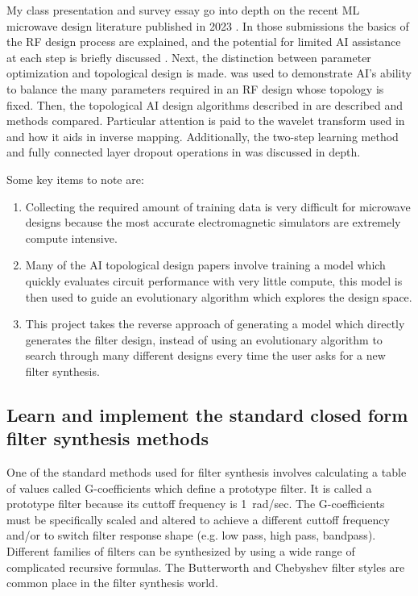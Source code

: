 \documentclass[10pt,conference]{IEEEtran}
\begin{document}
My class presentation and survey essay go into depth on the recent ML microwave design literature published in 2023 . In those submissions the basics of the RF design process are explained, and the potential for limited AI assistance at each step is briefly discussed \cite{lee2024icdesign}. Next, the distinction between parameter optimization and topological design is made. \cite{xue2023mmic} was used to demonstrate AI's ability to balance the many parameters required in an RF design whose topology is fixed. Then, the topological AI design algorithms described in \cite{xu2024microwave, karahan2024rfdesign, taskiran2024annsynthesis} are described and methods compared. Particular attention is paid to the wavelet transform used in \cite{xu2024microwave} and how it aids in inverse mapping. Additionally, the two-step learning method and fully connected layer dropout operations in \cite{karahan2024rfdesign} was discussed in depth.


Some key items to note are:
\begin{enumerate}[label=\arabic*)]
    \item Collecting the required amount of training data is very difficult for microwave designs because the most accurate electromagnetic simulators are extremely compute intensive.
    \item Many of the AI topological design papers involve training a model which quickly evaluates circuit performance with very little compute, this model is then used to guide an evolutionary algorithm which explores the design space.
    \item This project takes the reverse approach of generating a model which directly generates the filter design, instead of using an evolutionary algorithm to search through many different designs every time the user asks for a new filter synthesis.
\end{enumerate}


\subsection{Learn and implement the standard closed form filter synthesis methods}

One of the standard methods used for filter synthesis involves calculating a table of values called G-coefficients which define a prototype filter. It is called a prototype filter because its cuttoff frequency is 1~rad/sec. The G-coefficients must be specifically scaled and altered to achieve a different cuttoff frequency and/or to switch filter response shape (e.g. low pass, high pass, bandpass). Different families of filters can be synthesized by using a wide range of complicated recursive formulas. The Butterworth and Chebyshev filter styles are common place in the filter synthesis world.
\end{document}

